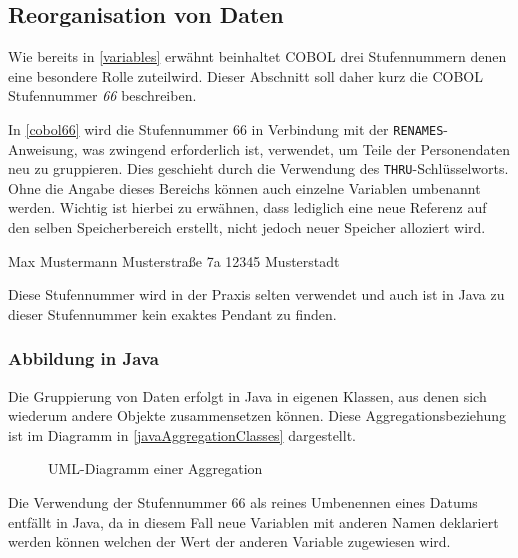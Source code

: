 \subsection{Reorganisation von Daten}
Wie bereits in \autoref{variables} erwähnt beinhaltet COBOL drei Stufennummern denen eine besondere Rolle zuteilwird. Dieser Abschnitt soll daher kurz die COBOL Stufennummer \textit{66} beschreiben.

In \autoref{cobol66} wird die Stufennummer 66 in Verbindung mit der \texttt{RENAMES}-Anweisung, was zwingend erforderlich ist, verwendet, um Teile der Personendaten neu zu gruppieren. Dies geschieht durch die Verwendung des \texttt{THRU}-Schlüsselworts. Ohne die Angabe dieses Bereichs können auch einzelne Variablen umbenannt werden. Wichtig ist hierbei zu erwähnen, dass lediglich eine neue Referenz auf den selben Speicherbereich erstellt, nicht jedoch neuer Speicher alloziert wird.
\begin{shellwindow}
Max       Mustermann
Musterstraße  7a   12345 Musterstadt   
\end{shellwindow}
Diese Stufennummer wird in der Praxis selten verwendet und auch ist in Java zu dieser Stufennummer kein exaktes Pendant zu finden. 
\subsubsection*{Abbildung in Java}
Die Gruppierung von Daten erfolgt in Java in eigenen Klassen, aus denen sich wiederum andere Objekte zusammensetzen können. Diese Aggregationsbeziehung ist im Diagramm in \autoref{javaAggregationClasses} dargestellt. 

\begin{figure}[H]
    \centering
    \caption{UML-Diagramm einer Aggregation}
    \label{javaAggregationClasses}
\end{figure}
Die Verwendung der Stufennummer 66 als reines Umbenennen eines Datums entfällt in Java, da in diesem Fall neue Variablen mit anderen Namen deklariert werden können welchen der Wert der anderen Variable zugewiesen wird.
